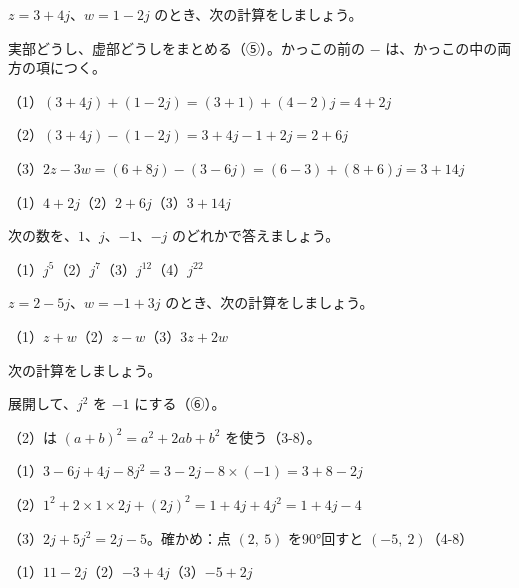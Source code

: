 \begin{reidai}
$z=3+4j$、$w=1-2j$ のとき、次の計算をしましょう。\newline{}\par
\kangaekata 実部どうし、虚部どうしをまとめる（⑤）。かっこの前の $-$ は、かっこの中の両方の項につく。\par
\shiki{}\zw{} （1）$(3+4j)+(1-2j)=(3+1)+(4-2)j=4+2j$\par
\bkviiq （2）$(3+4j)-(1-2j)=3+4j-1+2j=2+6j$\par
\bkviiq （3）$2z-3w=(6+8j)-(3-6j)=(6-3)+(8+6)j=3+14j$\par
\kotae{}\zw{} （1）$4+2j$\quad（2）$2+6j$\quad（3）$3+14j$
\end{reidai}

\noindent\begin{minipage}[t]{0.485\linewidth}\vspace{0pt}
\begin{jibun}
次の数を、$1$、$j$、$-1$、$-j$ のどれかで答えましょう。\par
（1）$j^5$\newline（2）$j^7$\newline（3）$j^{12}$\newline（4）$j^{22}$
\end{jibun}
\end{minipage}\hfill
\begin{minipage}[t]{0.485\linewidth}\vspace{0pt}
\begin{jibun}
$z=2-5j$、$w=-1+3j$ のとき、次の計算をしましょう。\par
（1）$z+w$\newline（2）$z-w$\newline（3）$3z+2w$
\end{jibun}
\end{minipage}

\begin{reidai}[かけ算]
次の計算をしましょう。\newline{}\par
\kangaekata 展開して、$j^2$ を $-1$ にする（⑥）。\par
（2）は $(a+b)^2=a^2+2ab+b^2$ を使う（3-8）。\par
\shiki{}\zw{} （1）$3-6j+4j-8j^2=3-2j-8\times(-1)=3+8-2j$\par
\bkviiq （2）$1^2+2\times1\times2j+(2j)^2=1+4j+4j^2=1+4j-4$\par
\bkviiq （3）$2j+5j^2=2j-5$。確かめ：点 $(2,\ 5)$ を90°回すと $(-5,\ 2)$（4-8）\par
\kotae{}\zw{} （1）$11-2j$\quad（2）$-3+4j$\quad（3）$-5+2j$
\end{reidai}

